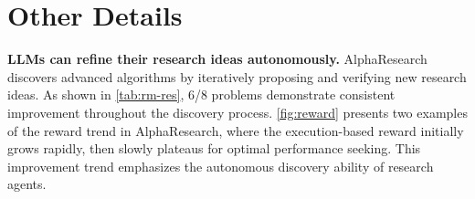 
\section{Other Details}
\textbf{LLMs can refine their research ideas autonomously.} AlphaResearch discovers advanced algorithms by iteratively proposing and verifying new research ideas. As shown in \autoref{tab:rm-res}, 6/8 problems demonstrate consistent improvement throughout the discovery process. 
\autoref{fig:reward} presents two examples of the reward trend in AlphaResearch, where the execution-based reward initially grows rapidly, then slowly plateaus for optimal performance seeking.
This improvement trend emphasizes the autonomous discovery ability of research agents.

